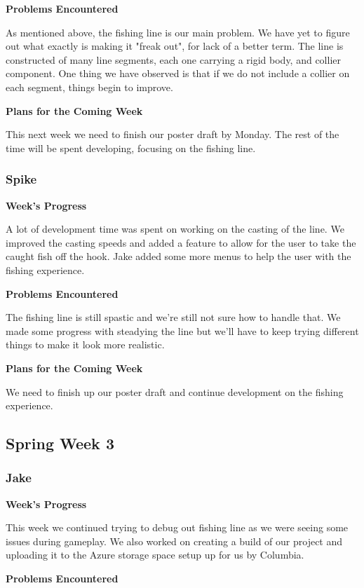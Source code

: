 \documentclass[10pt,journal,compsoc,onecolumn, draftclsnofoot]{IEEEtran}
\begin{document}
\noindent \textbf{Problems Encountered}

As mentioned above, the fishing line is our main problem. We have yet to figure out what exactly is making it "freak out", for lack of a better term. The line is constructed of many line segments, each one carrying a rigid body, and collier component. One thing we have observed is that if we do not include a collier on each segment, things begin to improve.

\noindent \textbf{Plans for the Coming Week}

This next week we need to finish our poster draft by Monday. The rest of the time will be spent developing, focusing on the fishing line.

\subsubsection{Spike}
\noindent \textbf{Week's Progress}

A lot of development time was spent on working on the casting of the line. We improved the casting speeds and added a feature to allow for the user to take the caught fish off the hook. Jake added some more menus to help the user with the fishing experience.

\noindent \textbf{Problems Encountered}

The fishing line is still spastic and we're still not sure how to handle that. We made some progress with steadying the line but we'll have to keep trying different things to make it look more realistic.

\noindent \textbf{Plans for the Coming Week}

We need to finish up our poster draft and continue development on the fishing experience.

\subsection{Spring Week 3}
\subsubsection{Jake}
\noindent \textbf{Week's Progress}

This week we continued trying to debug out fishing line as we were seeing some issues during gameplay. We also worked on creating a build of our project and uploading it to the Azure storage space setup up for us by Columbia.

\noindent \textbf{Problems Encountered}
\end{document}
